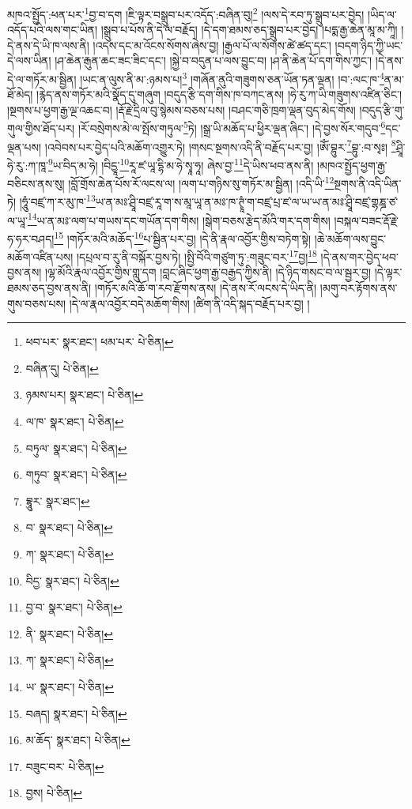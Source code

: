 མཁའ་སྤྱོད་:ཕན་པར་\footnote{ཕབ་པར་  སྣར་ཐང་། ཕམ་པར་  པེ་ཅིན། }བྱ་བ་དག །ཇི་ལྟར་བསྒྲུབ་པར་འདོད་:བཞིན་བུ།\footnote{བཞིན་དུ།  པེ་ཅིན། } །ལས་དེ་རབ་ཏུ་སྒྲུབ་པར་བྱེད། །ཡིད་ལ་འདོད་པའི་ལས་གང་ཡིན། །སྒྲུབ་པ་པོས་ནི་དེ་ལ་བརྗོད། །དེ་དག་ཐམས་ཅད་སྒྲུབ་པར་བྱེད། །པདྨ་རྒྱ་ཆེན་མཱ་མ་ཀཱི། །དེ་ནས་དེ་ཡི་ཁ་ལས་ནི། །འདས་དང་མ་འོངས་སོགས་ཞེས་བྱ། །རྒྱལ་པོ་ལ་སོགས་ཚེ་ཚད་དང་། །བདག་ཉིད་ཀྱི་ཡང་དེ་ལས་ཡིན། །ཤ་ཆེན་རྒུན་ཆང་ཟང་ཟིང་དང་། །སྐྱེ་བ་བདུན་པ་ལས་བྱུང་བ། །ཤ་ནི་ཆེན་པོ་དག་གིས་ཀྱང་། །དེ་ནས་དེ་ལ་གཏོར་མ་སྦྱིན། །ཡང་ན་ལུས་ནི་མ་:ཉམས་པ།\footnote{ཉམས་པར།  སྣར་ཐང་།  པེ་ཅིན། } །གཞོན་ནུའི་གཟུགས་ཅན་ཡོན་ཏན་ལྡན། །བ་:ལང་ཁ་\footnote{ལ་ཁ་  སྣར་ཐང་།  པེ་ཅིན། }ན་མ་ཐོ་མེད། །རྙེད་ནས་གཏོར་མའི་སྣོད་དུ་གཞུག །བདུད་རྩི་དག་གིས་ཁ་བཀང་ནས། །ཧེ་རུ་ཀ་ཡི་གཟུགས་འཛིན་ཅིང་། །སྔགས་པ་ཕྱག་རྒྱ་ལྔ་འཆང་བ། །རྡོ་རྗེ་དྲིལ་བུ་སྙེམས་བཅས་པས། །བཤང་གཅི་ཁྲག་ལྡན་བུད་མེད་གོས། །བདུད་རྩི་གུ་གུལ་གྱིས་ཐོད་པར། །རོ་བསྲེགས་མེ་ལ་སྤོས་གཏུལ་\footnote{བཏུལ་  སྣར་ཐང་།  པེ་ཅིན། }ཏེ། །སྒྲ་ཡི་མཆོད་པ་ཕྱིར་ལྡན་ཞིང་། །དེ་བྱས་སོར་གདུབ་\footnote{གཏུབ་  སྣར་ཐང་།  པེ་ཅིན། }དང་ལྡན་པས། །འབེབས་པར་བྱེད་པའི་མཆོག་འགྱུར་ཏེ། །གསང་སྔགས་འདི་ནི་བརྗོད་པར་བྱ། །ཨོཾ་བྷུར་\footnote{བྷཱུར་  སྣར་ཐང་། }བྷུ་:བ་སྭཿ། \footnote{བ་  སྣར་ཐང་།  པེ་ཅིན། }ཤྲཱི་ཧེ་རུ་:ཀ་ཁཱ་\footnote{ཀ་  སྣར་ཐང་།  པེ་ཅིན། }ཡ་བིད་མ་ཧེ། །བིདྱཱ་\footnote{བིདྱ་  སྣར་ཐང་།  པེ་ཅིན། }རཱ་ཛ་ཡཱ་དྷི་མ་ཧེ་སྭཱ་ཧཱ། ཞེས་བྱ་\footnote{བྱ་བ་  སྣར་ཐང་།  པེ་ཅིན། }དེ་ཡིས་ཕབ་ནས་ནི། །མཁའ་སྤྱོད་ཕྱག་རྒྱ་བཅིངས་ནས་སུ། །བློ་གྲོས་ཆེན་པོས་རོ་ལངས་ལ། །ལག་པ་གཉིས་སུ་གཏོར་མ་སྦྱིན། །འདི་ཡི་\footnote{ནི་  སྣར་ཐང་།  པེ་ཅིན། }སྔགས་ནི་འདི་ཡིན་ཏེ། །ཧཱུཾ་བཛྲ་ཀ་ར་མུ་ཁ་\footnote{ཀ་  སྣར་ཐང་།  པེ་ཅིན། }ཡ་ན་མཿ་ཤྲཱི་བཛྲ་རཱ་ག་ས་མཱ་ཡཱ་ན་མཿ་ཁ་ཊྭཱཾ་ག་བཛྲ་པྲ་ཛ་ལ་ཡ་ཡ་ན་མཿ་ཤྲཱི་བཛྲ་གྷཎྜ་ཙ་ལ་ཡཱ་\footnote{ཡ་  སྣར་ཐང་།  པེ་ཅིན། }ཡ་ན་མཿ་ལག་པ་གཡས་དང་གཡོན་དག་གིས། །སྒེག་བཅས་རྩེད་མོའི་གར་དག་གིས། །བསྐལ་བཟང་རྡོ་རྗེ་ཧ་ཧར་བཤད།\footnote{བཞད།  སྣར་ཐང་།  པེ་ཅིན། } །གཏོར་མའི་མཆོད་\footnote{མ་ཆོད་  སྣར་ཐང་།  པེ་ཅིན། }པ་སྦྱིན་པར་བྱ། །དེ་ནི་རྣལ་འབྱོར་གྱིས་བཏེག་སྟེ། །ཆེ་མཆོག་ལས་བྱུང་མཆོག་འཛིན་པས། །དཔྲལ་བ་རུ་ནི་བསྐོར་བྱས་ཏེ། །སྤྱི་བོའི་གཙུག་ཏུ་:གཟུང་བར་\footnote{བཟུང་བར་  པེ་ཅིན། }བྱ།\footnote{བྱས།  པེ་ཅིན། } །དེ་ནས་གར་བྱེད་ཕབ་བྱས་ནས། །ལྷ་མོའི་རྣལ་འབྱོར་གྱིས་གླུ་དག །བླང་ཞིང་ཕྱག་རྒྱ་བརྒྱད་ཀྱིས་ནི། །དེ་ཉིད་གསང་བ་ལ་སྦྱར་བྱ། །དེ་ལྟར་ཐམས་ཅད་བྱས་ནས་ནི། །གཏོར་མའི་ཆོ་ག་རབ་རྫོགས་ནས། །དེ་ནས་རོ་ལངས་དེ་ཡིད་ནི། །མགུ་བར་རྟོགས་ནས་གུས་བཅས་པས། །དེ་ལ་རྣལ་འབྱོར་བདེ་མཆོག་གིས། །ཚིག་ནི་འདི་སྐད་བརྗོད་པར་བྱ། །
